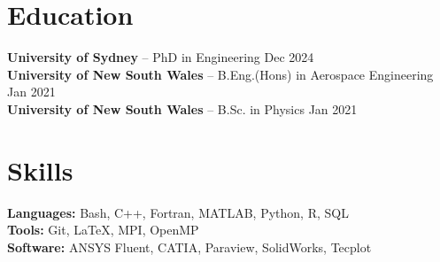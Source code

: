 \documentclass[11pt]{article}       %
\begin{document}

\section*{Education}
\textbf{University of Sydney} -- PhD in Engineering \hfill Dec 2024 \\
\textbf{University of New South Wales} -- B.Eng.(Hons) in Aerospace Engineering \hfill Jan 2021 \\
\textbf{University of New South Wales} -- B.Sc. in Physics \hfill Jan 2021

\vspace{-6.5pt}

\section*{Skills}
\textbf{Languages:} Bash, C++, Fortran, MATLAB, Python, R, SQL\\
\textbf{Tools:} Git, LaTeX, MPI, OpenMP \\
\textbf{Software:} ANSYS Fluent, CATIA, Paraview, SolidWorks, Tecplot
\end{document}
